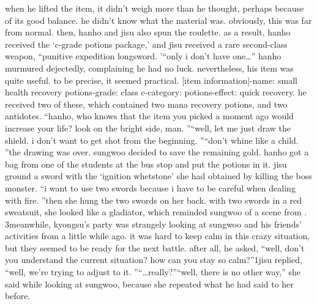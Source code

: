 when he lifted the item, it didn’t weigh more than he thought, perhaps because of its good balance.
 he didn’t know what the material was.
 obviously, this was far from normal.
then, hanho and jisu also spun the roulette.
 as a result, hanho received the ‘c-grade potions package,’ and jisu received a rare second-class weapon, “punitive expedition longsword.
’“only i don’t have one…” hanho murmured dejectedly, complaining he had no luck.
nevertheless, his item was quite useful.
 to be precise, it seemed practical.
[item information]-name: small health recovery potions-grade: class c-category: potions-effect: quick recovery.
he received two of these, which contained two mana recovery potions, and two antidotes.
“hanho, who knows that the item you picked a moment ago would increase your life? look on the bright side, man.
”“well, let me just draw the shield.
 i don’t want to get shot from the beginning.
”“don’t whine like a child.
”the drawing was over.
 sungwoo decided to save the remaining gold.
hanho got a bag from one of the students at the bus stop and put the potions in it.
 jisu ground a sword with the ‘ignition whetstone’ she had obtained by killing the boss monster.
“i want to use two swords because i have to be careful when dealing with fire.
”then she hung the two swords on her back.
 with two swords in a red sweatsuit, she looked like a gladiator, which reminded sungwoo of a scene from .
3meanwhile, kyongsu’s party was strangely looking at sungwoo and his friends’ activities from a little while ago.
 it was hard to keep calm in this crazy situation, but they seemed to be ready for the next battle.
after all, he asked, “well, don’t you understand the current situation? how can you stay so calm?”1jisu replied, “well, we’re trying to adjust to it.
”“…really?”“well, there is no other way,” she said while looking at sungwoo, because she repeated what he had said to her before.


 